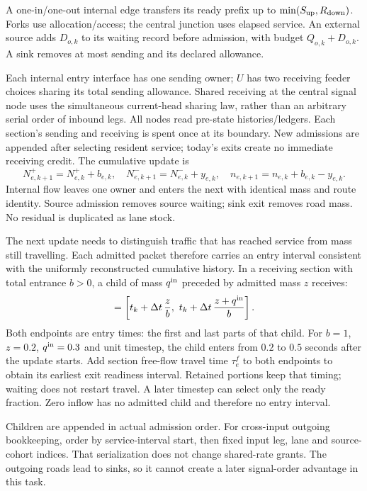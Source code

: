 \documentclass[10pt,a4paper]{article}
\newenvironment{revision}{\begingroup\color{revisionred}}{\par\endgroup}
\begin{document}
A one-in/one-out internal edge transfers its ready prefix up to
$\min(S_{\rm up},R_{\rm down})$. Forks use allocation/access; the central
junction uses elapsed service. An external source adds $D_{o,k}$ to its
waiting record before admission, with budget $Q_{o,k}+D_{o,k}$.
A sink removes at most sending and its declared allowance.

Each internal entry interface has one sending owner; $U$ has two
receiving feeder choices sharing its total sending allowance. Shared receiving at the
central signal node uses the simultaneous current-head sharing law, rather
than an arbitrary serial order of inbound legs.
All nodes read pre-state histories/ledgers. Each section's sending and
receiving is spent once at its boundary. New admissions are appended
after selecting resident service; today's exits create no immediate
receiving credit. The cumulative update is
\begin{equation}
 N^+_{e,k+1}=N^+_{e,k}+b_{e,k},\quad
 N^-_{e,k+1}=N^-_{e,k}+y_{e,k},\quad
 n_{e,k+1}=n_{e,k}+b_{e,k}-y_{e,k}.
 \label{eq:state-update}
\end{equation}
Internal flow leaves one owner and enters the next with identical mass
and route identity. Source admission removes source waiting; sink exit
removes road mass. No residual is duplicated as lane stock.

\begin{revision}
The next update needs to distinguish traffic that has reached service
from mass still travelling. Each admitted packet therefore carries an
entry interval consistent with the uniformly reconstructed cumulative
history. In a receiving section with total entrance $b>0$, a child of
mass $q^{\rm in}$ preceded by admitted mass $z$ receives:
\begin{equation}
 [t^{\rm in}_{\rm front},t^{\rm in}_{\rm tail}]
 =\left[t_k+\Delta t\,\frac z b,\
       t_k+\Delta t\,\frac{z+q^{\rm in}}b\right].
 \label{eq:entry-time}
\end{equation}
Both endpoints are entry times: the first and last parts of that child.
For $b=1$, $z=0.2$, $q^{\rm in}=0.3$ and unit timestep, the child enters
from $0.2$ to $0.5$ seconds after the update starts. Add section free-flow
travel time $\tau^f_e$ to both endpoints to obtain its earliest exit
readiness interval. Retained portions keep that timing; waiting does not
restart travel. A later timestep can select only the ready fraction.
Zero inflow has no admitted child and therefore no entry interval.

Children are appended in actual admission order. For cross-input
outgoing bookkeeping, order by service-interval start, then fixed input
leg, lane and source-cohort indices. That serialization does not change
shared-rate grants. The outgoing roads lead to sinks, so it cannot create
a later signal-order advantage in this task.
\end{revision}
\end{document}
